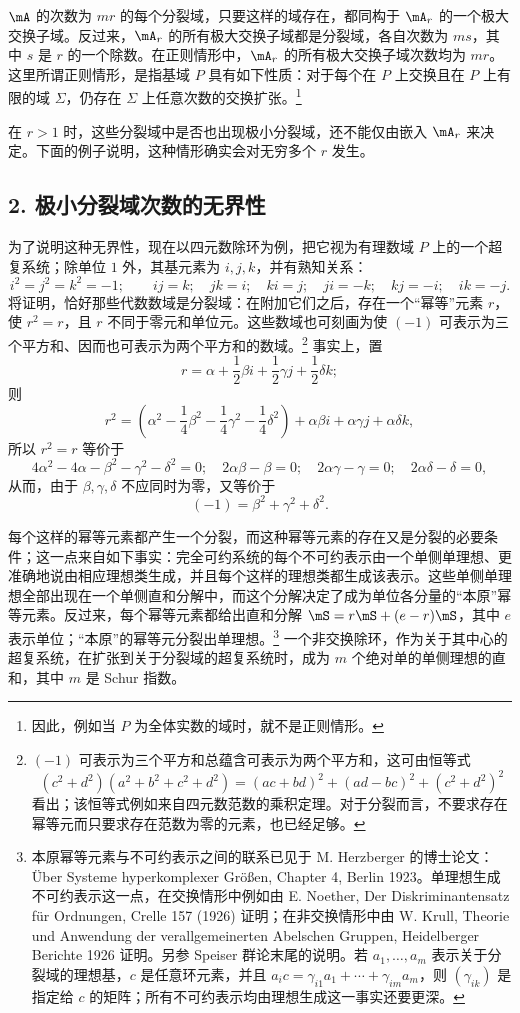 $\mA$ 的次数为 $mr$ 的每个分裂域，只要这样的域存在，都同构于 $\mA_r$ 的一个极大交换子域。反过来，$\mA_r$ 的所有极大交换子域都是分裂域，各自次数为 $ms$，其中 $s$ 是 $r$ 的一个除数。在正则情形中，$\mA_r$ 的所有极大交换子域次数均为 $mr$。这里所谓正则情形，是指基域 $P$ 具有如下性质：对于每个在 $P$ 上交换且在 $P$ 上有限的域 $\Sigma$，仍存在 $\Sigma$ 上任意次数的交换扩张。\footnote{因此，例如当 $P$ 为全体实数的域时，就不是正则情形。}

在 $r>1$ 时，这些分裂域中是否也出现极小分裂域，还不能仅由嵌入 $\mA_r$ 来决定。下面的例子说明，这种情形确实会对无穷多个 $r$ 发生。

\subsection*{2. 极小分裂域次数的无界性}

为了说明这种无界性，现在以四元数除环为例，把它视为有理数域 $P$ 上的一个超复系统；除单位 $1$ 外，其基元素为 $i,j,k$，并有熟知关系：
\[
 i^2=j^2=k^2=-1;\qquad ij=k;\quad jk=i;\quad ki=j;\quad ji=-k;\quad kj=-i;\quad ik=-j.
\]
将证明，恰好那些代数数域是分裂域：在附加它们之后，存在一个“幂等”元素 $r$，使 $r^2=r$，且 $r$ 不同于零元和单位元。这些数域也可刻画为使 $(-1)$ 可表示为三个平方和、因而也可表示为两个平方和的数域。\footnote{$(-1)$ 可表示为三个平方和总蕴含可表示为两个平方和，这可由恒等式
\[
(c^2+d^2)(a^2+b^2+c^2+d^2)=(ac+bd)^2+(ad-bc)^2+(c^2+d^2)^2
\]
看出；该恒等式例如来自四元数范数的乘积定理。对于分裂而言，不要求存在幂等元而只要求存在范数为零的元素，也已经足够。} 事实上，置
\[
        r=\alpha+\frac12\beta i+\frac12\gamma j+\frac12\delta k;
\]
则
\[
        r^2=\left(\alpha^2-\frac14\beta^2-\frac14\gamma^2-\frac14\delta^2\right)
          +\alpha\beta i+\alpha\gamma j+\alpha\delta k,
\]
所以 $r^2=r$ 等价于
\[
4\alpha^2-4\alpha-\beta^2-\gamma^2-\delta^2=0;\quad
2\alpha\beta-\beta=0;\quad 2\alpha\gamma-\gamma=0;\quad 2\alpha\delta-\delta=0,
\]
从而，由于 $\beta,\gamma,\delta$ 不应同时为零，又等价于
\[
        (-1)=\beta^2+\gamma^2+\delta^2.
\]

每个这样的幂等元素都产生一个分裂，而这种幂等元素的存在又是分裂的必要条件；这一点来自如下事实：完全可约系统的每个不可约表示由一个单侧单理想、更准确地说由相应理想类生成，并且每个这样的理想类都生成该表示。这些单侧单理想全部出现在一个单侧直和分解中，而这个分解决定了成为单位各分量的“本原”幂等元素。反过来，每个幂等元素都给出直和分解 $\mS=r\mS+(e-r)\mS$，其中 $e$ 表示单位；“本原”的幂等元分裂出单理想。\footnote{本原幂等元素与不可约表示之间的联系已见于 M. Herzberger 的博士论文：Über Systeme hyperkomplexer Größen, Chapter 4, Berlin 1923。单理想生成不可约表示这一点，在交换情形中例如由 E. Noether, Der Diskriminantensatz für Ordnungen, Crelle 157 (1926) 证明；在非交换情形中由 W. Krull, Theorie und Anwendung der verallgemeinerten Abelschen Gruppen, Heidelberger Berichte 1926 证明。另参 Speiser 群论末尾的说明。若 $a_1,\ldots,a_m$ 表示关于分裂域的理想基，$c$ 是任意环元素，并且 $a_i c=\gamma_{i1}a_1+\cdots+\gamma_{im}a_m$，则 $(\gamma_{ik})$ 是指定给 $c$ 的矩阵；所有不可约表示均由理想生成这一事实还要更深。} 一个非交换除环，作为关于其中心的超复系统，在扩张到关于分裂域的超复系统时，成为 $m$ 个绝对单的单侧理想的直和，其中 $m$ 是 Schur 指数。

